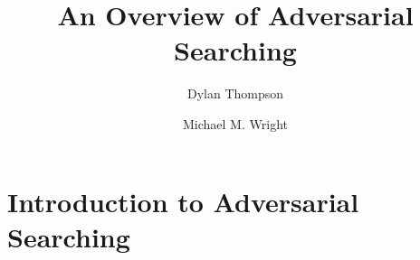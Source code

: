 \documentclass[a4paper,11pt]{report}
\title{An Overview of Adversarial Searching}
\author{Dylan Thompson \and Michael M. Wright}
\begin{document}
\maketitle
\tableofcontents

\begin{abstract}
\end{abstract}

\chapter{Introduction to Adversarial Searching}
\end{document}

